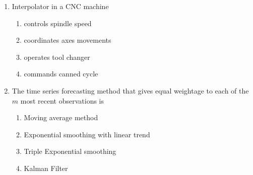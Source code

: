 \documentclass[journal,12pt,onecolumn]{IEEEtran}
\theoremstyle{remark}
\begin{document}
\begin{enumerate}
\begin{enumerate}
    \end{enumerate}
    \item Interpolator in a CNC machine
    \begin{enumerate}
        \item controls spindle speed
        \item coordinates axes movements
        \item operates tool changer
        \item commands canned cycle
    \end{enumerate}
    \item The time series forecasting method that gives equal weightage to each of the $m$ most recent observations is 
    \begin{enumerate}
        \item Moving average method
        \item Exponential smoothing with linear trend
        \item Triple Exponential smoothing 
        \item Kalman Filter
    \end{enumerate}
\end{enumerate}
\end{document}
